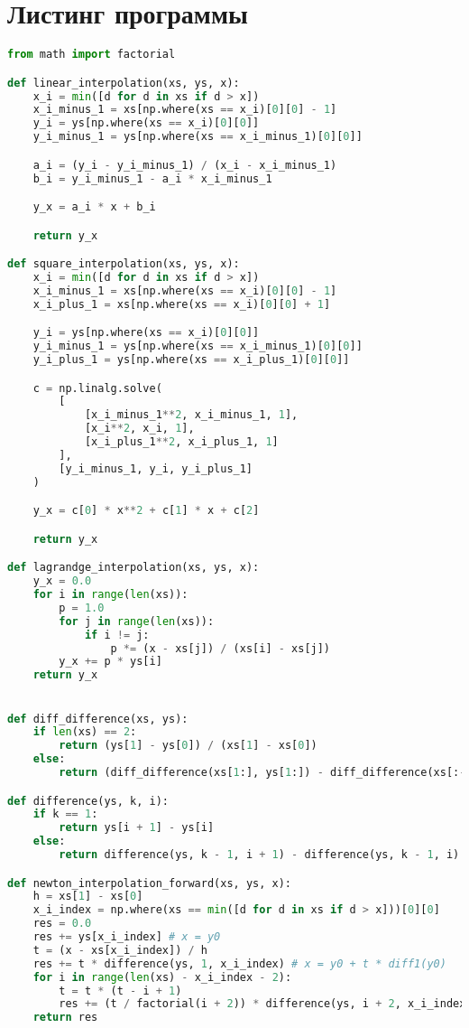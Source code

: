 \documentclass[12pt, a4paper]{article}
\begin{document}
\section*{Листинг программы}
\begin{lstlisting}[language = Python]
  from math import factorial

def linear_interpolation(xs, ys, x):
    x_i = min([d for d in xs if d > x])
    x_i_minus_1 = xs[np.where(xs == x_i)[0][0] - 1]
    y_i = ys[np.where(xs == x_i)[0][0]]
    y_i_minus_1 = ys[np.where(xs == x_i_minus_1)[0][0]]

    a_i = (y_i - y_i_minus_1) / (x_i - x_i_minus_1)
    b_i = y_i_minus_1 - a_i * x_i_minus_1

    y_x = a_i * x + b_i

    return y_x

def square_interpolation(xs, ys, x):
    x_i = min([d for d in xs if d > x])
    x_i_minus_1 = xs[np.where(xs == x_i)[0][0] - 1]
    x_i_plus_1 = xs[np.where(xs == x_i)[0][0] + 1]

    y_i = ys[np.where(xs == x_i)[0][0]]
    y_i_minus_1 = ys[np.where(xs == x_i_minus_1)[0][0]]
    y_i_plus_1 = ys[np.where(xs == x_i_plus_1)[0][0]]

    c = np.linalg.solve(
        [
            [x_i_minus_1**2, x_i_minus_1, 1],
            [x_i**2, x_i, 1],
            [x_i_plus_1**2, x_i_plus_1, 1]
        ],
        [y_i_minus_1, y_i, y_i_plus_1]
    )

    y_x = c[0] * x**2 + c[1] * x + c[2]

    return y_x

def lagrandge_interpolation(xs, ys, x):
    y_x = 0.0
    for i in range(len(xs)):
        p = 1.0
        for j in range(len(xs)):
            if i != j:
                p *= (x - xs[j]) / (xs[i] - xs[j])
        y_x += p * ys[i]
    return y_x


def diff_difference(xs, ys):
    if len(xs) == 2:
        return (ys[1] - ys[0]) / (xs[1] - xs[0])
    else:
        return (diff_difference(xs[1:], ys[1:]) - diff_difference(xs[:-1], ys[:-1])) / (xs[len(xs) - 1] - xs[0])

def difference(ys, k, i):
    if k == 1:
        return ys[i + 1] - ys[i]
    else:
        return difference(ys, k - 1, i + 1) - difference(ys, k - 1, i)

def newton_interpolation_forward(xs, ys, x):
    h = xs[1] - xs[0]
    x_i_index = np.where(xs == min([d for d in xs if d > x]))[0][0]
    res = 0.0
    res += ys[x_i_index] # x = y0
    t = (x - xs[x_i_index]) / h
    res += t * difference(ys, 1, x_i_index) # x = y0 + t * diff1(y0)
    for i in range(len(xs) - x_i_index - 2):
        t = t * (t - i + 1)
        res += (t / factorial(i + 2)) * difference(ys, i + 2, x_i_index)
    return res


\end{lstlisting}
\end{document}
